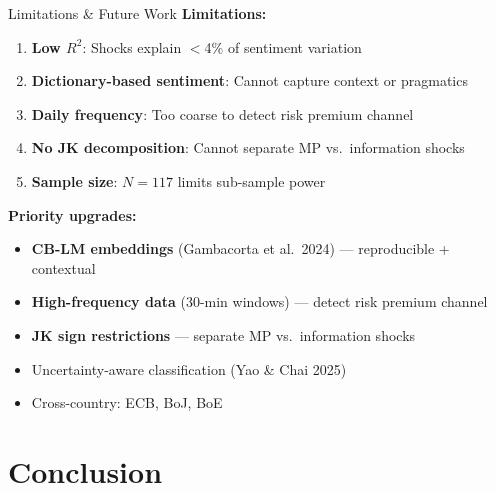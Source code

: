 \documentclass[aspectratio=169, 11pt]{beamer}
\begin{document}
\begin{frame}{Limitations \& Future Work}
\textbf{Limitations:}
\begin{enumerate}
  \item \textbf{Low $R^2$}: Shocks explain $<$4\% of sentiment variation
  \item \textbf{Dictionary-based sentiment}: Cannot capture context or pragmatics
  \item \textbf{Daily frequency}: Too coarse to detect risk premium channel
  \item \textbf{No JK decomposition}: Cannot separate MP vs.\ information shocks
  \item \textbf{Sample size}: $N = 117$ limits sub-sample power
\end{enumerate}

\vspace{0.5em}
\textbf{Priority upgrades:}
\begin{itemize}
  \item \textcolor{success}{\textbf{CB-LM embeddings}} (Gambacorta et al.\ 2024) --- reproducible + contextual
  \item \textcolor{success}{\textbf{High-frequency data}} (30-min windows) --- detect risk premium channel
  \item \textcolor{success}{\textbf{JK sign restrictions}} --- separate MP vs.\ information shocks
  \item Uncertainty-aware classification (Yao \& Chai 2025)
  \item Cross-country: ECB, BoJ, BoE
\end{itemize}
\end{frame}

\section{Conclusion}
\end{document}
